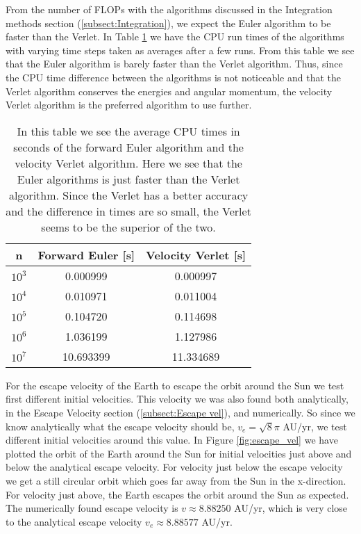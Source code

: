\documentclass[12pt,a4paper,english]{article}
\begin{document}
From the number of FLOPs with the algorithms discussed in the Integration methods section (\ref{subsect:Integration}), we expect the Euler algorithm to be faster than the Verlet. In Table \ref{tab:times} we have the CPU run times of the algorithms with varying time steps taken as averages after a few runs. From this table we see that the Euler algorithm is barely faster than the Verlet algorithm. Thus, since the CPU time difference between the algorithms is not noticeable and that the Verlet algorithm conserves the energies and angular momentum, the velocity Verlet algorithm is the preferred algorithm to use further.

\begin{table}[htbp]
	\centering
	\begin{tabular}{ |c|c|c| }
		\hline \rule{0pt}{13pt}
		n & Forward Euler [s] & Velocity Verlet [s] \\
		\hline \rule{0pt}{13pt}
		$10^3$ & 0.000999 & 0.000997  \\
		\hline \rule{0pt}{13pt}
		$10^4$ & 0.010971 & 0.011004 \\
		\hline \rule{0pt}{13pt}
		$10^5$ & 0.104720 & 0.114698 \\
		\hline \rule{0pt}{13pt}
		$10^6$ & 1.036199 & 1.127986 \\
		\hline \rule{0pt}{13pt}
		$10^7$ & 10.693399 & 11.334689 \\
		\hline 
	\end{tabular}	
	\caption{In this table we see the average CPU times in seconds of the forward Euler algorithm and the velocity Verlet algorithm. Here we see that the Euler algorithms is just faster than the Verlet algorithm. Since the Verlet has a better accuracy and the difference in times are so small, the Verlet seems to be the superior of the two.}
	\label{tab:times}
\end{table}

For the escape velocity of the Earth to escape the orbit around the Sun we test first different initial velocities. This velocity we was also found both analytically, in the Escape Velocity section (\ref{subsect:Escape vel}), and numerically. So since we know analytically what the escape velocity should be, $v_e=\sqrt{8}\pi$ AU/yr, we test different initial velocities around this value. In Figure \ref{fig:escape_vel} we have plotted the orbit of the Earth around the Sun for initial velocities just above and below the analytical escape velocity. For velocity just below the escape velocity we get a still circular orbit which goes far away from the Sun in the x-direction. For velocity just above, the Earth escapes the orbit around the Sun as expected. The numerically found escape velocity is $v\approx 8.88250$ AU/yr, which is very close to the analytical escape velocity $v_e\approx 8.88577$ AU/yr.
\end{document}
